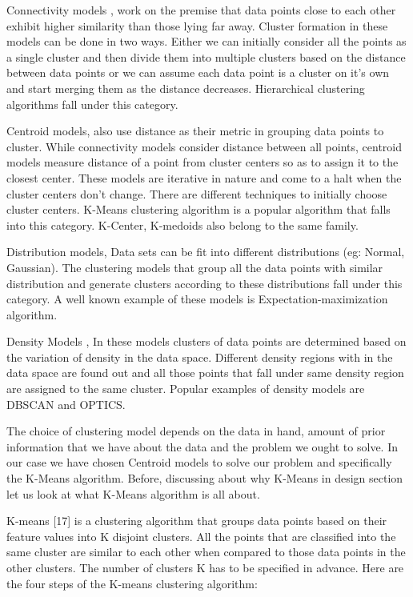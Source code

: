 Connectivity models \cite{doi:10.1093/comjnl/26.4.354}, work on the premise that data points close to each other exhibit higher similarity than those lying far away. Cluster formation in these models can be done in two ways. Either we can initially consider all the points as a single cluster and then divide them into multiple clusters based on the distance between data points or we can assume each data point is a cluster on it's own and start merging them as the distance decreases. Hierarchical clustering algorithms fall under this category.

Centroid models, also use distance as their metric in grouping data points to cluster. While connectivity models consider distance between all points, centroid models measure distance of a point from cluster centers so as to assign it to the closest center. These models are iterative in nature and come to a halt when the cluster centers don't change. There are different techniques to initially choose cluster centers.  K-Means clustering algorithm \cite{Derpanis06k-meansclustering} is a popular algorithm that falls into this category. K-Center, K-medoids also belong to the same family.
 
Distribution models\cite{Johnson2000}, Data sets can be fit into different distributions (eg: Normal, Gaussian). The clustering models that group all the data points with similar distribution and generate clusters according to these distributions fall under this category. A well known example of these models is Expectation-maximization algorithm. 

Density Models \cite{thang2011anomaly}, In these models clusters of data points are determined based on the variation of density in the data space. Different density regions with in the data space are found out and all those points that fall under same density region are assigned to the same cluster. Popular examples of density models are DBSCAN and OPTICS.

The choice of clustering model depends on the data in hand, amount of prior information that we have about the data and the problem we ought to solve. In our case we have chosen Centroid models to solve our problem and specifically the K-Means algorithm. Before, discussing about why K-Means in design section let us look at what K-Means algorithm is all about.

K-means [17] is a clustering algorithm that groups data points based on their feature values into K disjoint clusters. All the points that are classified into the same cluster are similar to each other when compared to those data points in the other clusters. The number of clusters K has to be specified in advance. Here are the four steps of the K-means clustering
algorithm:

